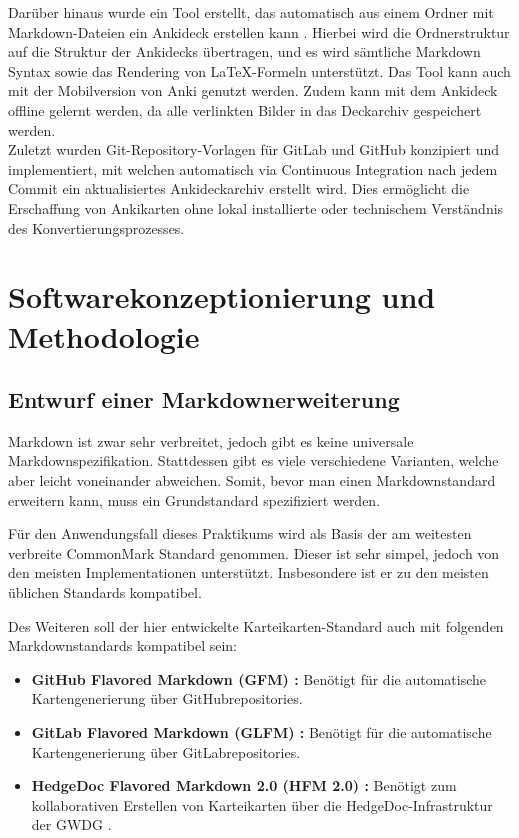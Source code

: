 \documentclass[ngerman]{article}
\begin{document}
Darüber hinaus wurde ein Tool erstellt, das automatisch aus einem Ordner mit Markdown-Dateien ein Ankideck erstellen kann \cite{Ankiding}. Hierbei wird die Ordnerstruktur auf die Struktur der Ankidecks übertragen, und es wird sämtliche Markdown Syntax sowie das Rendering von \LaTeX-Formeln unterstützt. Das Tool kann auch mit der Mobilversion von Anki genutzt werden. Zudem kann mit dem Ankideck offline gelernt werden, da alle verlinkten Bilder in das Deckarchiv gespeichert werden.\\

Zuletzt wurden Git-Repository-Vorlagen für GitLab \cite{GitlabTemplate} und GitHub \cite{GithubTemplate} konzipiert und implementiert, mit welchen automatisch via Continuous Integration nach jedem Commit ein aktualisiertes Ankideckarchiv erstellt wird. Dies ermöglicht die Erschaffung von Ankikarten ohne lokal installierte oder technischem Verständnis des Konvertierungsprozesses.

\newpage


\section{Softwarekonzeptionierung und Methodologie}
\subsection{Entwurf einer Markdownerweiterung}
Markdown ist zwar sehr verbreitet, jedoch gibt es keine universale Markdownspezifikation. Stattdessen gibt es viele verschiedene Varianten, welche aber leicht voneinander abweichen. Somit, bevor man einen Markdownstandard erweitern kann, muss ein Grundstandard spezifiziert werden.

Für den Anwendungsfall dieses Praktikums wird als Basis der am weitesten verbreite CommonMark \cite{CommonMark} Standard genommen. Dieser ist sehr simpel, jedoch von den meisten Implementationen unterstützt. Insbesondere ist er zu den meisten üblichen Standards kompatibel.

Des Weiteren soll der hier entwickelte Karteikarten-Standard auch mit folgenden Markdownstandards kompatibel sein:
\begin{itemize}
  \item \textbf{GitHub Flavored Markdown (GFM) \cite{GFM}:} Benötigt für die automatische Kartengenerierung über GitHubrepositories.
  \item \textbf{GitLab Flavored Markdown (GLFM) \cite{GLFM} :} Benötigt für die automatische Kartengenerierung über GitLabrepositories.
  \item \textbf{HedgeDoc Flavored Markdown 2.0 (HFM 2.0) \cite{HFM2}:} Benötigt zum kollaborativen Erstellen von Karteikarten über die HedgeDoc-Infrastruktur der GWDG \cite{HedgeDocGWDG}.
\end{itemize}
\end{document}
